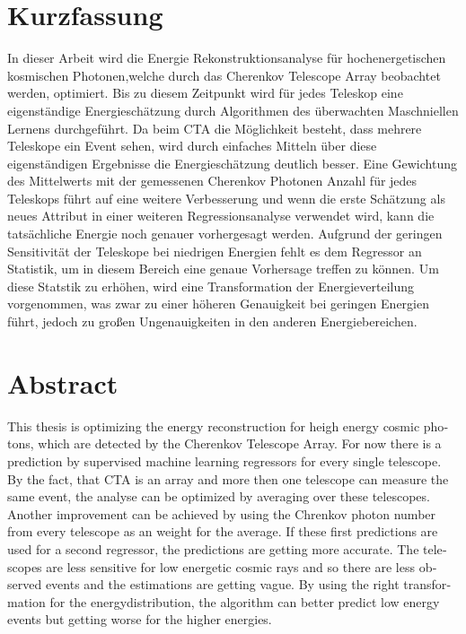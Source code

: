 \thispagestyle{plain}

\section*{Kurzfassung}
In dieser Arbeit wird die Energie Rekonstruktionsanalyse für hochenergetischen kosmischen Photonen,welche durch das Cherenkov
Telescope Array beobachtet werden, optimiert. Bis zu diesem
Zeitpunkt wird für jedes Teleskop eine eigenständige Energieschätzung durch Algorithmen des überwachten Maschniellen Lernens durchgeführt.
Da beim CTA die Möglichkeit besteht, dass mehrere Teleskope ein Event sehen, wird durch einfaches Mitteln über diese eigenständigen
Ergebnisse die Energieschätzung deutlich besser. Eine Gewichtung des Mittelwerts mit der gemessenen Cherenkov Photonen Anzahl für jedes
Teleskops führt auf eine weitere Verbesserung und wenn die erste Schätzung als neues Attribut in einer weiteren Regressionsanalyse verwendet
wird, kann die tatsächliche Energie noch genauer vorhergesagt werden. Aufgrund der geringen Sensitivität der Teleskope bei niedrigen
Energien fehlt es dem Regressor an Statistik, um in diesem Bereich eine genaue Vorhersage treffen zu können. Um diese Statstik zu erhöhen, wird eine
Transformation der Energieverteilung vorgenommen, was zwar zu einer höheren Genauigkeit bei geringen Energien führt, jedoch zu großen
Ungenauigkeiten in den anderen Energiebereichen.

\section*{Abstract}
\begin{english}
This thesis is optimizing the energy reconstruction for heigh energy cosmic photons, which are detected by the Cherenkov Telescope Array.
For now there is a prediction by supervised
machine learning regressors for every single telescope. By the fact, that CTA is an array and more then one telescope can measure the
same event, the analyse can be optimized by averaging over these telescopes. Another improvement can be achieved by using the Chrenkov photon
number from every telescope as an weight for the average. If these first predictions are used for a second regressor, the predictions
are getting more accurate. The telescopes are less sensitive for low energetic cosmic rays and so there are less observed events and the
estimations are getting vague. By using the right transformation for the energydistribution, the algorithm can better predict low energy
events but getting worse for the higher energies.
\end{english}
